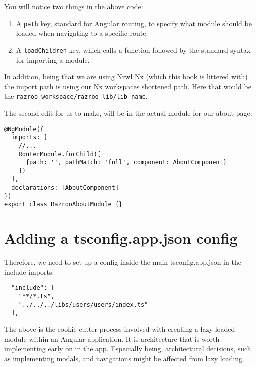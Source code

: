 You will notice two things in the above code: 
\begin{enumerate}
  \item A \lstinline{path} key, standard for Angular routing, to specify what 
  module should be loaded when navigating to a specific route. 
  \item A \lstinline{loadChildren} key, which calls a function followed by the 
  standard syntax for importing a module. 
\end{enumerate}

In addition, being that we are using Nrwl Nx (which this book is littered with)
the import path is using our Nx workspaces shortened path. Here that would be the 
\lstinline{razroo-workspace/razroo-lib/lib-name}.

The second edit for us to make, will be in the actual module for our about page: 
\begin{lstlisting}
@NgModule({
  imports: [
    //...
    RouterModule.forChild([
      {path: '', pathMatch: 'full', component: AboutComponent}
    ])
  ],
  declarations: [AboutComponent]
})
export class RazrooAboutModule {}
\end{lstlisting}



\section{Adding a tsconfig.app.json config}
Therefore, we need to set up a config inside the main tsconfig.app.json in the
include imports:
\begin{verbatim}
  "include": [
    "**/*.ts",
    "../../../libs/users/users/index.ts"
  ],
\end{verbatim}

The above is the cookie cutter process involved with creating a lazy loaded module 
within an Angular application. It is architecture that is worth implementing early on 
in the app. Especially being, architectural decisions, such as implementing modals, and 
navigations might be affected from lazy loading. 